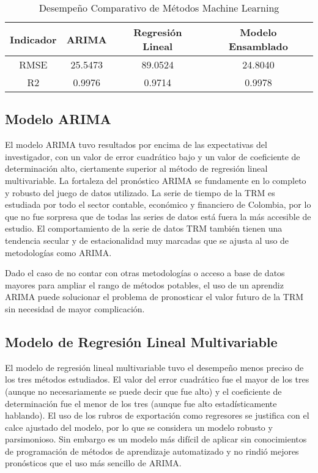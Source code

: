 \begin{table}[h!]
  \begin{center}
    \caption{Desempeño Comparativo de Métodos Machine Learning}
    \label{tab:table1}
    \begin{tabular}{c|c|c|c}
      \textbf{Indicador} & \textbf{ARIMA} & \textbf{Regresión Lineal} & \textbf{Modelo Ensamblado}\\
      \hline
      RMSE & 25.5473 &89.0524 & 24.8040 \\
      R2 & 0.9976 & 0.9714 & 0.9978 \\
    \end{tabular}
  \end{center}
\end{table}

\subsection{Modelo ARIMA}
El modelo ARIMA tuvo resultados por encima de las expectativas del investigador, con un valor de error cuadrático bajo y un valor de coeficiente de determinación alto, ciertamente superior al método de regresión lineal multivariable. La fortaleza del pronóstico ARIMA se fundamente en lo completo y robusto del juego de datos utilizado. La serie de tiempo de la TRM es estudiada por todo el sector contable, económico y financiero de Colombia, por lo que no fue sorpresa que de todas las series de datos está fuera la más accesible de estudio. El comportamiento de la serie de datos TRM también tienen una tendencia secular y de estacionalidad muy marcadas que se ajusta al uso de metodologías como ARIMA.

Dado el caso de no contar con otras metodologías o acceso a base de datos mayores para ampliar el rango de métodos potables, el uso de un aprendiz ARIMA puede solucionar el problema de pronosticar el valor futuro de la TRM sin necesidad de mayor complicación.

\subsection{Modelo de Regresión Lineal Multivariable}
El modelo de regresión lineal multivariable tuvo el desempeño menos preciso de los tres métodos estudiados. El valor del error cuadrático fue el mayor de los tres (aunque no necesariamente se puede decir que fue alto) y el coeficiente de determinación fue el menor de los tres (aunque fue alto estadísticamente hablando). El uso de los rubros de exportación como regresores se justifica con el calce ajustado del modelo, por lo que se considera un modelo robusto y parsimonioso. Sin embargo es un modelo más difícil de aplicar sin conocimientos de programación de métodos de aprendizaje automatizado y no rindió mejores pronósticos que el uso más sencillo de ARIMA.

